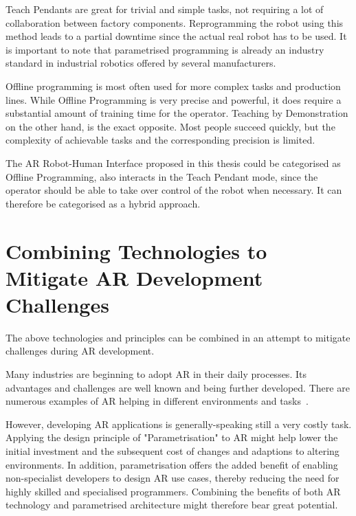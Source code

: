 Teach Pendants are great for trivial and simple tasks, not requiring a lot of collaboration between factory components. Reprogramming the robot using this method leads to a partial downtime since the actual real robot has to be used. It is important to note that parametrised programming is already an industry standard in industrial robotics offered by several manufacturers. 

Offline programming is most often used for more complex tasks and production lines. While Offline Programming is very precise and powerful, it does require a substantial amount of training time for the operator. Teaching by Demonstration on the other hand, is the exact opposite. Most people succeed quickly, but the complexity of achievable tasks and the corresponding precision is limited.

The AR Robot-Human Interface proposed in this thesis could be categorised as Offline Programming, also interacts in the Teach Pendant mode, since the operator should be able to take over control of the robot when necessary. It can therefore be categorised as a hybrid approach.

\section{Combining Technologies to Mitigate AR Development Challenges}

The above technologies and principles can be combined in an attempt to mitigate challenges during AR development. 

Many industries are beginning to adopt AR in their daily processes. Its advantages and challenges are well known and being further developed. There are numerous examples of AR helping in different environments and tasks~\cite{DiegmannBenefitsAREdu, SalaminBenefitsAR, ARInMilRepair}. 

However, developing AR applications is generally-speaking still a very costly task. Applying the design principle of "Parametrisation" to AR might help lower the initial investment and the subsequent cost of changes and adaptions to altering environments. In addition, parametrisation offers the added benefit of enabling non-specialist developers to design AR use cases, thereby reducing the need for highly skilled and specialised programmers. Combining the benefits of both AR technology and parametrised architecture might therefore bear great potential.

